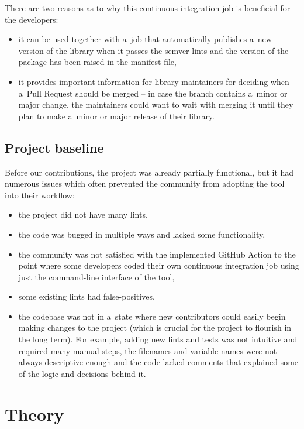 \documentclass[licencjacka,en]{pracamgr}
\begin{document}
There are two reasons as to why this continuous integration job is beneficial for the developers:
\begin{itemize}
	\item it can be used together with a~job that automatically publishes a~new version of the
		library when it passes the semver lints and the version of the package has been raised
		in the manifest file,
	\item it provides important information for library maintainers for deciding when a~Pull
		Request should be merged -- in case the branch contains a~minor or major change, the
		maintainers could want to wait with merging it until they plan to make a~minor or major
		release of their library.
\end{itemize}


\section{Project baseline}\label{r:section_project_baseline}

Before our contributions, the project was already partially functional, but it had numerous issues
which often prevented the community from adopting the tool into their workflow:
\begin{itemize}
	\item the project did not have many lints,
	\item the code was bugged in multiple ways and lacked some functionality,
	\item the community was not satisfied with the implemented GitHub Action to the point where some
		developers coded their own continuous integration job using just the command-line interface
		of the tool,
	\item some existing lints had false-positives,
	\item the codebase was not in a~state where new contributors could easily begin making changes
		to the project (which is crucial for the project to flourish in the long term).
		For example, adding new lints and tests was not intuitive and required many manual steps,
		the filenames and variable names were not always descriptive enough and the code lacked
		comments that explained some of the logic and decisions behind it.
\end{itemize}


\chapter{Theory}\label{r:chapter_theory}
\end{document}
